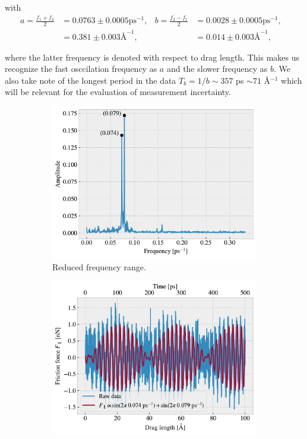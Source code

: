 with 
\begin{align*}
  a = \frac{f_1 + f_2}{2} &= 0.0763 \pm 0.0005 \text{ps}^{-1},& 
  b = \frac{f_2 - f_1}{2} &= 0.0028 \pm 0.0005 \text{ps}^{-1},& \\
  &= 0.381 \pm 0.003 \text{Å}^{-1},& 
  &= 0.014 \pm 0.003 \text{Å}^{-1},& 
\end{align*}

where the latter frequency is denoted with respect to drag length. This makes us recognize the fast osccilation frequency as $a$ and the slower frequency as $b$. We also take note of the longest period in the data $T_b = 1/b \sim 357$ ps $\sim 71$ Å$^{-1}$ which will be relevant for the evaluation of measurement incertainty.



\begin{figure}[H]
  \centering
  \begin{subfigure}[b]{0.49\textwidth}
    \centering
    \includegraphics[width=\textwidth]{figures/baseline/ft_zoom.pdf}
    \caption{Reduced frequency range.}
    \label{fig:ft_a}
  \end{subfigure}
  \hfill
  \begin{subfigure}[b]{0.49\textwidth}
      \centering
      \includegraphics[width=\textwidth]{figures/baseline/ft_sine.pdf}

\end{subfigure}
\end{figure}

